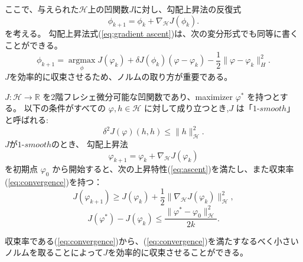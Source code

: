 ここで、与えられた$\mathcal{H}$上の凹関数$J$に対し、勾配上昇法の反復式
\begin{equation}
    \label{eq:gradient ascent}
    \phi_{k+1} = \phi_k + \nabla_\mathcal{H} J(\phi_k).
\end{equation}
を考える。
勾配上昇法式(\ref{eq:gradient ascent})は、次の変分形式でも同等に書くことができる。
\begin{equation}
    \label{eq:gradient ascent variational}
    \phi_{k+1} =  \underset{\phi} {\operatorname{argmax}} J(\varphi_k) + \delta J(\phi_k)(\varphi-\varphi_k) - \frac{1}{2}\|\varphi-\varphi_k\|_H^2.
\end{equation}
$J$を効率的に収束させるため、ノルムの取り方が重要である。
\begin{thm}
    \label{thm:chose norm}
    $J: \mathcal{H} \rightarrow \mathbb{R}$ を2階フレシェ微分可能な凹関数であり、maximizer $\varphi^*$ を持つとする。
    以下の条件がすべての $\varphi, h \in \mathcal{H}$ に対して成り立つとき,$J$ は「$1$-$smooth$」と呼ばれる:
    \begin{equation}
        \label{eq:1-smooth}
        \delta^2 J(\varphi)(h, h) \leq \|h\|_\mathcal{H}^2.
    \end{equation}
    $J$が$1$-$smooth$のとき、
    勾配上昇法 
    $$
        \varphi_{k+1} = \varphi_k + \nabla_\mathcal{H} J(\varphi_k)
    $$
    を初期点 $\varphi_0$ から開始すると、次の上昇特性(\ref{eq:ascent})を満たし、また収束率(\ref{eq:convergence})を持つ：
    \begin{equation}
        \label{eq:ascent}
        J(\varphi_{k+1}) \geq J(\varphi_k) + \frac{1}{2}\|\nabla_\mathcal{H} J(\varphi_k)\|_\mathcal{H}^2,
    \end{equation}
    \begin{equation}
        \label{eq:convergence}
        J(\varphi^*) - J(\varphi_k) \leq \frac{\|\varphi^* - \varphi_0\|_\mathcal{H}^2}{2k}.
    \end{equation}
\end{thm}
収束率である(\ref{eq:convergence})から、(\ref{eq:convergence})を満たすなるべく小さいノルムを取ることによって$J$を効率的に収束させることができる。



